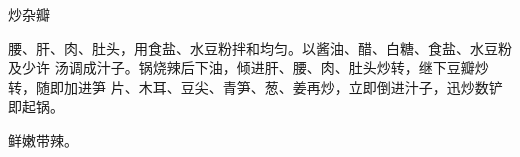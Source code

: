 %
%
%
%
%
%
%
\begin{recipe}{炒杂瓣}

\ingredients


\preparation

腰、肝、肉、肚头，用食盐、水豆粉拌和均匀。以酱油、醋、白糖、食盐、水豆粉及少许
汤调成汁子。锅烧辣后下油，倾进肝、腰、肉、肚头炒转，继下豆瓣炒转，随即加进笋
片、木耳、豆尖、青笋、葱、姜再炒，立即倒进汁子，迅炒数铲即起锅。

\features

鲜嫩带辣。

\end{recipe}

